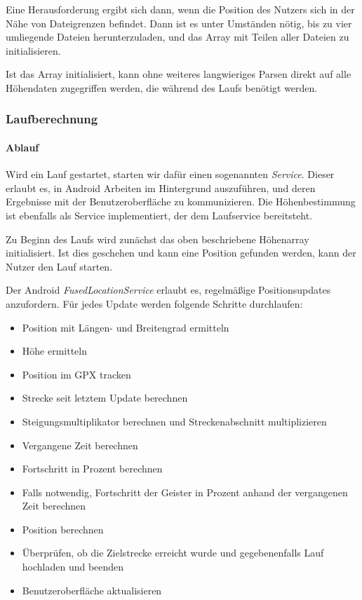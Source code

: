 Eine Herausforderung ergibt sich dann, wenn die Position des Nutzers sich in der Nähe von Dateigrenzen befindet. Dann ist es unter Umständen nötig, bis zu vier umliegende Dateien herunterzuladen, und das Array mit Teilen aller Dateien zu initialisieren.

Ist das Array initialisiert, kann ohne weiteres langwieriges Parsen direkt auf alle Höhendaten zugegriffen werden, die während des Laufs benötigt werden.
\subsubsection{Laufberechnung}
\paragraph{Ablauf}
Wird ein Lauf gestartet, starten wir dafür einen sogenannten \textit{Service}. Dieser erlaubt es, in Android Arbeiten im Hintergrund auszuführen, und deren Ergebnisse mit der Benutzeroberfläche zu kommunizieren. Die Höhenbestimmung ist ebenfalls als Service implementiert, der dem Laufservice bereitsteht.

Zu Beginn des Laufs wird zunächst das oben beschriebene Höhenarray initialisiert. Ist dies geschehen und kann eine Position gefunden werden, kann der Nutzer den Lauf starten.

Der Android \textit{FusedLocationService} erlaubt es, regelmäßige Positionsupdates anzufordern. Für jedes Update werden folgende Schritte durchlaufen:
\begin{itemize}
\item Position mit Längen- und Breitengrad ermitteln
\item Höhe ermitteln
\item Position im GPX tracken
\item Strecke seit letztem Update berechnen
\item Steigungsmultiplikator berechnen und Streckenabschnitt multiplizieren
\item Vergangene Zeit berechnen
\item Fortschritt in Prozent berechnen
\item Falls notwendig, Fortschritt der Geister in Prozent anhand der vergangenen Zeit berechnen
\item Position berechnen
\item Überprüfen, ob die Zielstrecke erreicht wurde und gegebenenfalls Lauf hochladen und beenden
\item Benutzeroberfläche aktualisieren
\end{itemize}
